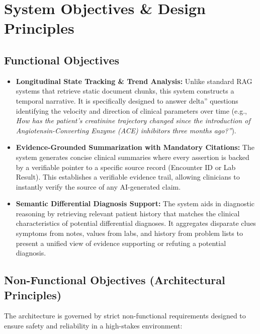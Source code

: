 \section{System Objectives \& Design Principles}
\label{sec:objectives}

\subsection{Functional Objectives}
\begin{itemize} 
    \item \textbf{Longitudinal State Tracking \& Trend Analysis:} Unlike standard RAG systems that retrieve static document chunks, this system constructs a temporal narrative. It is specifically designed to answer delta'' questions identifying the velocity and direction of clinical parameters over time (e.g., \textit{How has the patient's creatinine trajectory changed since the introduction of Angiotensin-Converting Enzyme (ACE) inhibitors three months ago?''}).
    
    \item \textbf{Evidence-Grounded Summarization with Mandatory Citations:} The system generates concise clinical summaries where every assertion is backed by a verifiable pointer to a specific source record (Encounter ID or Lab Result). This  establishes a verifiable evidence trail, allowing clinicians to instantly verify the source of any AI-generated claim.

    \item \textbf{Semantic Differential Diagnosis Support:} The system aids in diagnostic reasoning by retrieving relevant patient history that matches the clinical characteristics of potential differential diagnoses. It aggregates disparate clues symptoms from notes, values from labs, and history from problem lists to present a unified view of evidence supporting or refuting a potential diagnosis.
\end{itemize}

\subsection{Non-Functional Objectives (Architectural Principles)}
The architecture is governed by strict non-functional requirements designed to ensure safety and reliability in a high-stakes environment:

